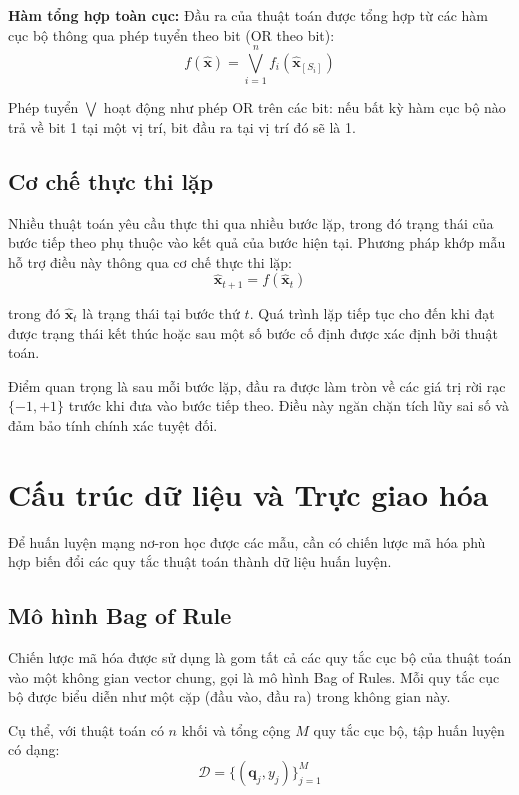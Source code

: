 \textbf{Hàm tổng hợp toàn cục:} Đầu ra của thuật toán được tổng hợp từ các hàm cục bộ thông qua phép tuyển theo bit (OR theo bit):
\begin{equation}
    f(\hat{\mathbf{x}}) = \bigvee_{i=1}^{n} f_i(\hat{\mathbf{x}}_{[S_i]})
\end{equation}

Phép tuyển $\bigvee$ hoạt động như phép OR trên các bit: nếu bất kỳ hàm cục bộ nào trả về bit 1 tại một vị trí, bit đầu ra tại vị trí đó sẽ là 1.

\subsection{Cơ chế thực thi lặp}

Nhiều thuật toán yêu cầu thực thi qua nhiều bước lặp, trong đó trạng thái của bước tiếp theo phụ thuộc vào kết quả của bước hiện tại. Phương pháp khớp mẫu hỗ trợ điều này thông qua cơ chế thực thi lặp:
\begin{equation}
    \hat{\mathbf{x}}_{t+1} = f(\hat{\mathbf{x}}_t)
\end{equation}

trong đó $\hat{\mathbf{x}}_t$ là trạng thái tại bước thứ $t$. Quá trình lặp tiếp tục cho đến khi đạt được trạng thái kết thúc hoặc sau một số bước cố định được xác định bởi thuật toán.

Điểm quan trọng là sau mỗi bước lặp, đầu ra được làm tròn về các giá trị rời rạc $\{-1, +1\}$ trước khi đưa vào bước tiếp theo. Điều này ngăn chặn tích lũy sai số và đảm bảo tính chính xác tuyệt đối.

\section{Cấu trúc dữ liệu và Trực giao hóa}

Để huấn luyện mạng nơ-ron học được các mẫu, cần có chiến lược mã hóa phù hợp biến đổi các quy tắc thuật toán thành dữ liệu huấn luyện.

\subsection{Mô hình Bag of Rule}

Chiến lược mã hóa được sử dụng là gom tất cả các quy tắc cục bộ của thuật toán vào một không gian vector chung, gọi là mô hình Bag of Rules. Mỗi quy tắc cục bộ được biểu diễn như một cặp (đầu vào, đầu ra) trong không gian này.

Cụ thể, với thuật toán có $n$ khối và tổng cộng $M$ quy tắc cục bộ, tập huấn luyện có dạng:
\begin{equation}
    \mathcal{D} = \{(\mathbf{q}_j, y_j)\}_{j=1}^{M}
\end{equation}

